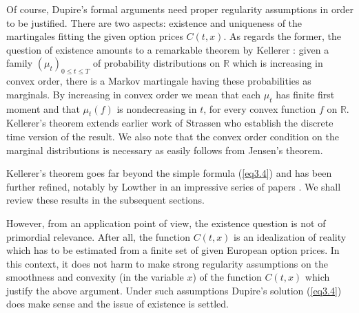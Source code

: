 \documentclass[11pt,a4paper]{article}%
\def\comment#1{\marginpar{\raggedright\scriptsize{\textcolor{purple}{#1}}}}
\def\R{{\mathbb R}}
\numberwithin{equation}{section}
\begin{document}
Of course, Dupire's formal arguments need proper regularity assumptions in order to be justified. There are two aspects: existence and uniqueness of the martingales fitting the given option prices $C(t,x)$. As regards the former, the question of existence amounts to a remarkable theorem by Kellerer \cite{Ke72, Ke73}: %
given a family $(\mu_t)_{0 \le t \le T}$ of probability distributions on $\R$ which is  increasing in convex order, there is a Markov martingale having these probabilities as marginals. %
By increasing in convex order we mean that each $\mu_t$ has finite first moment and that $\mu_t (f)$ is nondecreasing in $t$, for every convex function $f$ on $\R$. 
Kellerer's theorem extends earlier work of Strassen \cite{St65} who establish the discrete time version of the result. We also note that the convex order condition on the marginal distributions is necessary as easily follows from Jensen's theorem.



Kellerer's theorem goes far beyond the simple formula (\ref{eq3.4}) and has been further refined, notably by Lowther in an impressive series of papers \cite{Lo08a, Lo08b, Lo08d}. We shall review these results in the subsequent sections.

However, from an application point of view, the existence question is not of primordial relevance. After all, the function $C(t,x)$ is an idealization of reality which has to be estimated from a finite set of given European option prices. In this context, it does not harm to make strong regularity assumptions on the smoothness and convexity (in the variable $x$) of the function $C(t,x)$  which justify the above argument. Under such assumptions Dupire's solution (\ref{eq3.4}) does make sense and the issue of existence is settled.
\end{document}
